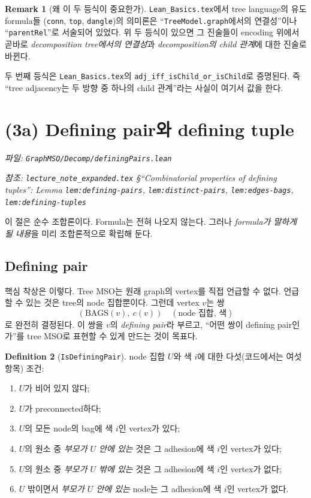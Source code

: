 \documentclass[11pt]{article}
\theoremstyle{definition}
\newtheorem{definition}{Definition}[section]
\newtheorem{remark}[definition]{Remark}
\theoremstyle{plain}
\newcommand{\lean}[1]{\texttt{#1}}
\newcommand{\leanfile}[1]{\texttt{#1}}
\newcommand{\BAGS}{\mathrm{BAGS}}
\begin{document}
\begin{remark}[왜 이 두 등식이 중요한가]
\leanfile{Lean\_Basics.tex}에서 tree language의 유도 formula들
(\lean{conn}, \lean{top}, \lean{dangle})의 의미론은 ``\lean{TreeModel.graph}에서의
연결성''이나 ``\lean{parentRel}''로 서술되어 있었다. 위 두 등식이 있으면
그 진술들이 encoding 위에서 곧바로 \emph{decomposition tree에서의 연결성}과
\emph{decomposition의 child 관계}에 대한 진술로 바뀐다.

두 번째 등식은 \leanfile{Lean\_Basics.tex}의
\lean{adj\_iff\_isChild\_or\_isChild}로 증명된다. 즉 ``tree adjacency는
두 방향 중 하나의 child 관계''라는 사실이 여기서 값을 한다.
\end{remark}

\section{(3a) Defining pair와 defining tuple}
\label{mso:sec:definingpairs}

\emph{파일: \leanfile{GraphMSO/Decomp/definingPairs.lean}}

\emph{참조: \leanfile{lecture\_note\_expanded.tex} \S``Combinatorial properties
of defining tuples'': Lemma \lean{lem:defining-pairs},
\lean{lem:distinct-pairs}, \lean{lem:edges-bags}, \lean{lem:defining-tuples}}

이 절은 순수 조합론이다. Formula는 전혀 나오지 않는다. 그러나 \emph{formula가
말하게 될 내용}을 미리 조합론적으로 확립해 둔다.

\subsection{Defining pair}

핵심 착상은 이렇다. Tree MSO는 원래 graph의 vertex를 직접 언급할 수 없다.
언급할 수 있는 것은 tree의 node 집합뿐이다. 그런데 vertex $v$는 쌍
\[
  (\BAGS(v),\ c(v)) \quad (\text{node 집합, 색})
\]
로 완전히 결정된다. 이 쌍을 $v$의 \emph{defining pair}라 부르고, ``어떤 쌍이
defining pair인가''를 tree MSO로 표현할 수 있게 만드는 것이 목표다.

\begin{definition}[\lean{IsDefiningPair}]
\label{mso:def:isdefiningpair}
node 집합 $U$와 색 $i$에 대한 다섯(코드에서는 여섯 항목) 조건:
\begin{enumerate}
  \item $U$가 비어 있지 않다;
  \item $U$가 preconnected하다;
  \item $U$의 모든 node의 bag에 색 $i$인 vertex가 있다;
  \item $U$의 원소 중 \emph{부모가 $U$ 안에 있는} 것은 그 adhesion에 색 $i$인
    vertex가 있다;
  \item $U$의 원소 중 \emph{부모가 $U$ 밖에 있는} 것은 그 adhesion에 색 $i$인
    vertex가 없다;
  \item $U$ 밖이면서 \emph{부모가 $U$ 안에 있는} node는 그 adhesion에 색 $i$인
    vertex가 없다.
\end{enumerate}
\end{definition}
\end{document}
